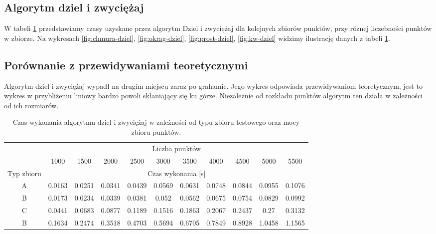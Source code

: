 \documentclass[11pt]{article}
\theoremstyle{remark} \newtheorem{definition}{def.}
\theoremstyle{definition} \newtheorem{twierdzenie}{tw.}
\begin{document}
\subsection{Algorytm dziel i zwyciężaj}

W tabeli \ref{tab:dziel} przedstawiamy czasy uzyskane przez algorytm Dziel i zwyciężaj dla kolejnych zbiorów punktów, przy różnej liczebności punktów w zbiorze. Na wykresach \ref{fig:chmura-dziel}, 
\ref{fig:okrag-dziel}, \ref{fig:prost-dziel}, \ref{fig:kw-dziel} widzimy ilustrację danych z tabeli \ref{tab:dziel}.

\subsection{Porównanie z przewidywaniami teoretycznymi}
Algorytm dziel i zwyciężaj wypadł na drugim miejscu zaraz po grahamie. Jego wykres odpowiada przewidywaniom teoretycznym,
jest to wykres w przybliżeniu liniowy bardzo powoli skłaniający się ku górze. Niezależnie od rozkładu punktów algorytm
ten działa w zależności od ich rozmiarów.

\begin{table}[]
\centering
\caption{Czas wykonania algorytmu dziel i zwyciężaj w zależności od typu zbioru testowego oraz mocy zbioru punktów.}
\label{tab:dziel}
\begin{tabular}{c|c|c|c|c|c|c|c|c|c|c|}
\cline{2-11}
\multicolumn{1}{l|}{} & \multicolumn{10}{c|}{Liczba punktów} \\ \cline{2-11} 
\multicolumn{1}{l|}{} & 1000 & 1500 & 2000 & 2500 & 3000 & 3500 & 4000 & 4500 & 5000 & 5500 \\ \hline
\multicolumn{1}{|c|}{Typ zbioru} & \multicolumn{10}{c|}{Czas wykonania {[}s{]}} \\ \hline
\multicolumn{1}{|c|}{A} & 0.0163 & 0.0251 & 0.0341 & 0.0439 & 0.0569 & 0.0631 & 0.0748 & 0.0844 & 0.0955 & 0.1076 \\ \hline
\multicolumn{1}{|c|}{B} & 0.0173 & 0.0234 & 0.0339 & 0.0381 & 0.052 & 0.0562 & 0.0675 & 0.0754 & 0.0829 & 0.0992 \\ \hline
\multicolumn{1}{|c|}{C} & 0.0441 & 0.0683 & 0.0877 & 0.1189 & 0.1516 & 0.1863 & 0.2067 & 0.2437 & 0.27 & 0.3132 \\ \hline
\multicolumn{1}{|c|}{B} & 0.1634 & 0.2474 & 0.3518 & 0.4703 & 0.5694 & 0.6705 & 0.7849 & 0.8928 & 1.0458 & 1.1565 \\ \hline
\end{tabular}
\end{table}
\end{document}
